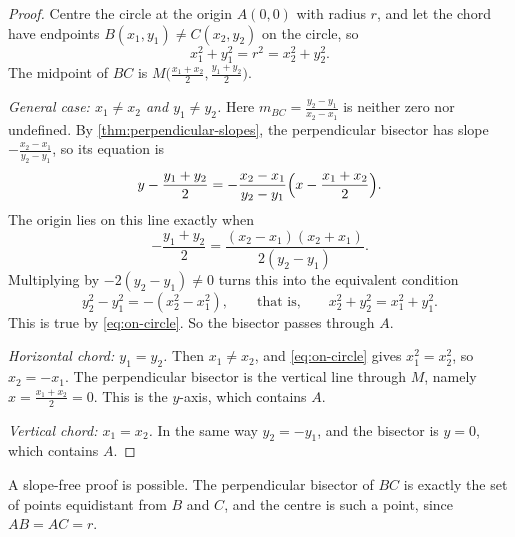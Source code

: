 \begin{proof}
  Centre the circle at the origin $A(0, 0)$ with radius $r$, and let the
  chord have endpoints $B(x_1, y_1) \neq C(x_2, y_2)$ on the circle, so
  \begin{equation}\label{eq:on-circle}
    x_1^2 + y_1^2 = r^2 = x_2^2 + y_2^2.
  \end{equation}
  The midpoint of $BC$ is
  $M\bigl(\frac{x_1 + x_2}{2}, \frac{y_1 + y_2}{2}\bigr)$.

  \emph{General case: $x_1 \neq x_2$ and $y_1 \neq y_2$.} Here
  $m_{BC} = \frac{y_2 - y_1}{x_2 - x_1}$ is neither zero nor undefined. By
  \cref{thm:perpendicular-slopes}, the perpendicular bisector has slope
  $-\frac{x_2 - x_1}{y_2 - y_1}$, so its equation is
  \[
    y - \frac{y_1 + y_2}{2}
    = -\frac{x_2 - x_1}{y_2 - y_1}\Bigl(x - \frac{x_1 + x_2}{2}\Bigr).
  \]
  The origin lies on this line exactly when
  \[
    -\frac{y_1 + y_2}{2} = \frac{(x_2 - x_1)(x_2 + x_1)}{2(y_2 - y_1)}.
  \]
  Multiplying by $-2(y_2 - y_1) \neq 0$ turns this into the equivalent
  condition
  \[
    y_2^2 - y_1^2 = -(x_2^2 - x_1^2),
    \qquad\text{that is,}\qquad
    x_2^2 + y_2^2 = x_1^2 + y_1^2.
  \]
  This is true by \eqref{eq:on-circle}. So the bisector passes through $A$.

  \emph{Horizontal chord: $y_1 = y_2$.} Then $x_1 \neq x_2$, and
  \eqref{eq:on-circle} gives $x_1^2 = x_2^2$, so $x_2 = -x_1$. The
  perpendicular bisector is the vertical line through $M$, namely
  $x = \frac{x_1 + x_2}{2} = 0$. This is the $y$-axis, which contains $A$.

  \emph{Vertical chord: $x_1 = x_2$.} In the same way $y_2 = -y_1$, and the
  bisector is $y = 0$, which contains $A$.
\end{proof}

\begin{remark}
  A slope-free proof is possible. The perpendicular bisector of $BC$ is
  exactly the set of points equidistant from $B$ and $C$, and the centre is
  such a point, since $AB = AC = r$.
\end{remark}
